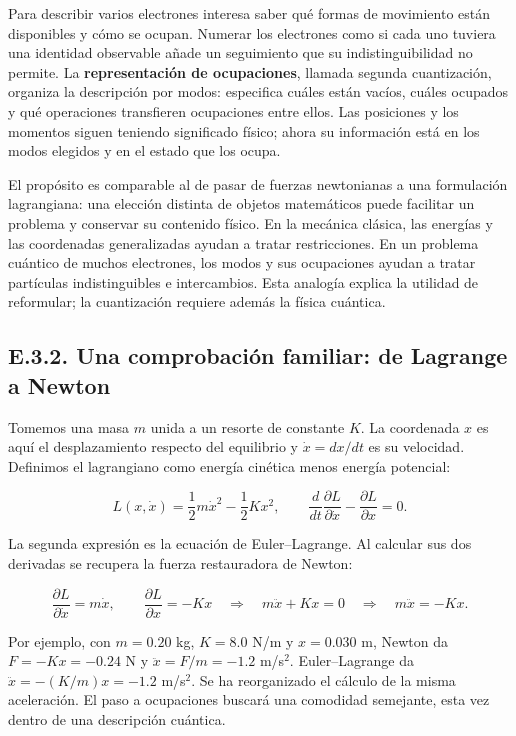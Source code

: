 \documentclass[
  spanish,
  10pt,
  a4paper,
]{article}
\begin{document}
Para describir varios electrones interesa saber qué formas de movimiento
están disponibles y cómo se ocupan. Numerar los electrones como si cada
uno tuviera una identidad observable añade un seguimiento que su
indistinguibilidad no permite. La \textbf{representación de
ocupaciones}, llamada segunda cuantización, organiza la descripción por
modos: especifica cuáles están vacíos, cuáles ocupados y qué operaciones
transfieren ocupaciones entre ellos. Las posiciones y los momentos
siguen teniendo significado físico; ahora su información está en los
modos elegidos y en el estado que los ocupa.

El propósito es comparable al de pasar de fuerzas newtonianas a una
formulación lagrangiana: una elección distinta de objetos matemáticos
puede facilitar un problema y conservar su contenido físico. En la
mecánica clásica, las energías y las coordenadas generalizadas ayudan a
tratar restricciones. En un problema cuántico de muchos electrones, los
modos y sus ocupaciones ayudan a tratar partículas indistinguibles e
intercambios. Esta analogía explica la utilidad de reformular; la
cuantización requiere además la física cuántica.

\subsection{E.3.2. Una comprobación familiar: de Lagrange a
Newton}\label{e.3.2.-una-comprobaciuxf3n-familiar-de-lagrange-a-newton}

Tomemos una masa \(m\) unida a un resorte de constante \(K\). La
coordenada \(x\) es aquí el desplazamiento respecto del equilibrio y
\(\dot x=dx/dt\) es su velocidad. Definimos el lagrangiano como energía
cinética menos energía potencial:

\[
L(x,\dot x)=\frac12m\dot x^2-\frac12Kx^2,
\qquad
\frac{d}{dt}\frac{\partial L}{\partial\dot x}
-\frac{\partial L}{\partial x}=0.
\tag{E06.a}
\]

La segunda expresión es la ecuación de Euler--Lagrange. Al calcular sus
dos derivadas se recupera la fuerza restauradora de Newton:

\[
\frac{\partial L}{\partial\dot x}=m\dot x,
\qquad \frac{\partial L}{\partial x}=-Kx
\quad\Longrightarrow\quad
m\ddot x+Kx=0
\quad\Longrightarrow\quad m\ddot x=-Kx.
\tag{E06.b}
\]

Por ejemplo, con \(m=0.20\) kg, \(K=8.0\) N/m y \(x=0.030\) m, Newton da
\(F=-Kx=-0.24\) N y \(\ddot x=F/m=-1.2\) m/s\(^2\). Euler--Lagrange da
\(\ddot x=-(K/m)x=-1.2\) m/s\(^2\). Se ha reorganizado el cálculo de la
misma aceleración. El paso a ocupaciones buscará una comodidad
semejante, esta vez dentro de una descripción cuántica.
\end{document}

